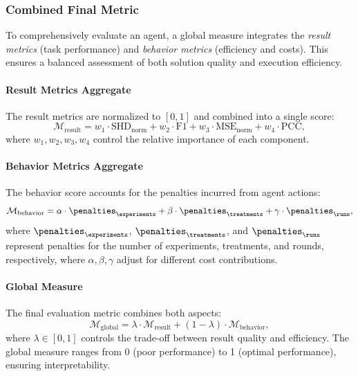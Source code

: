 \documentclass{article}
\begin{document}
        \subsubsection{Combined Final Metric}
            To comprehensively evaluate an agent, a global measure integrates the \emph{result metrics} (task performance) and \emph{behavior metrics} (efficiency and costs). This ensures a balanced assessment of both solution quality and execution efficiency.
            
            \paragraph{Result Metrics Aggregate}  
                The result metrics are normalized to $[0,1]$ and combined into a single score:
                \begin{equation*}
                    \mathcal{M}_{\text{result}} = w_1 \cdot \text{SHD}_{\text{norm}} + w_2 \cdot \text{F1} + w_3 \cdot \text{MSE}_{\text{norm}} + w_4 \cdot \text{PCC},
                \end{equation*}
                where $ w_1, w_2, w_3, w_4 $ control the relative importance of each component.
            
            \paragraph{Behavior Metrics Aggregate}  
                The behavior score accounts for the penalties incurred from agent actions:
                \begin{equation*}
                    \mathcal{M}_{\text{behavior}} = \alpha \cdot \penalties_{\experiments} + \beta \cdot \penalties_{\treatments} + \gamma \cdot \penalties_{\runs},
                \end{equation*}
                where $\penalties_{\experiments}$, $\penalties_{\treatments}$, and $\penalties_{\runs}$ represent penalties for the number of experiments, treatments, and rounds, respectively, where $ \alpha, \beta, \gamma $ adjust for different cost contributions.
            
            \paragraph{Global Measure}  
                The final evaluation metric combines both aspects:
                \begin{equation*}
                    \mathcal{M}_{\text{global}} = \lambda \cdot \mathcal{M}_{\text{result}} + (1 - \lambda) \cdot \mathcal{M}_{\text{behavior}},
                \end{equation*}
                where $ \lambda \in [0,1] $ controls the trade-off between result quality and efficiency. The global measure ranges from 0 (poor performance) to 1 (optimal performance), ensuring interpretability.
\end{document}
